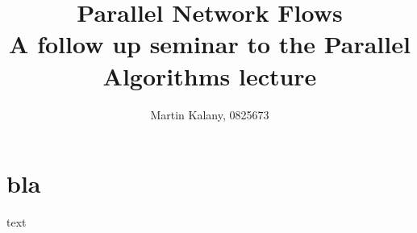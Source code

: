 \documentclass[a4paper,10pt]{article}
\title{Parallel Network Flows \\
    A follow up seminar to the Parallel Algorithms lecture}
\author{Martin Kalany, 0825673}
\begin{document}
\maketitle
\section{bla}
text \cite{ahuja93} \cite{papa95} \cite{yossi81} \cite{vishkin92} \cite{goldberg89} \cite{goldberg91} \cite{goldberg98} \cite{johnson87} \cite{schieber89} \cite{cherivan89} 

\printbibliography
\end{document}
